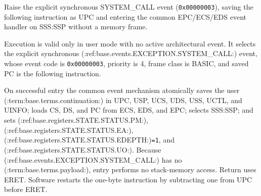 Raise the explicit synchronous SYSTEM\_CALL event (\texttt{0x00000003}), saving the following instruction as UPC and entering the common EPC/ECS/EDS event handler on SSS:SSP without a memory frame.

Execution is valid only in user mode with no active architectural event. It selects the explicit synchronous (:ref:base.events.EXCEPTION.SYSTEM_CALL:) event, whose event code is \texttt{0x00000003}, priority is 4, frame class is BASIC, and saved PC is the following instruction.

On successful entry the common event mechanism atomically saves the user (:term:base.terms.continuation:) in UPC, USP, UCS, UDS, USS, UCTL, and UINFO; loads CS, DS, and PC from ECS, EDS, and EPC; selects SSS:SSP; and sets (:ref:base.registers.STATE.STATUS.PM:), (:ref:base.registers.STATE.STATUS.EA:), (:ref:base.registers.STATE.STATUS.EDEPTH:)\texttt{=1}, and (:ref:base.registers.STATE.STATUS.UO:). Because (:ref:base.events.EXCEPTION.SYSTEM_CALL:) has no (:term:base.terms.payload:), entry performs no stack-memory access. Return uses ERET. Software restarts the one-byte instruction by subtracting one from UPC before ERET.
